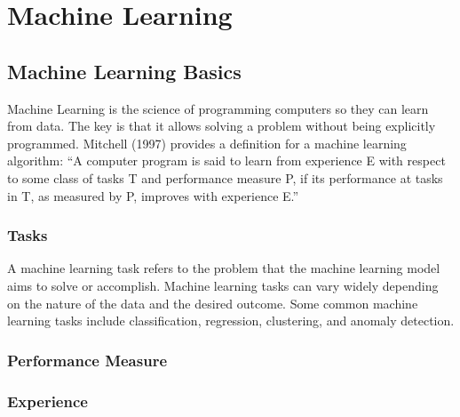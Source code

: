 \documentclass[../main.tex]{subfiles}
\begin{document}
	\chapter{Machine Learning} \label{ch:machine}
	

	\section{Machine Learning Basics}
	\noindent 
	
	\noindent Machine Learning is the science of programming computers so they can learn from data. The key is that it allows solving a problem without being explicitly programmed. Mitchell (1997) provides a deﬁnition for a machine learning algorithm: “A computer program is said to learn from experience E with respect to some class of tasks T and performance measure P, if its performance at tasks in T, as measured by P, improves with experience E.” 
	
	
	
	\subsection{Tasks}
	A machine learning task refers to the problem that the machine learning model aims to solve or accomplish. Machine learning tasks can vary widely depending on the nature of the data and the desired outcome. Some common machine learning tasks include classification, regression, clustering, and anomaly detection.
	
	
	\subsection{Performance Measure}
	\subsection{Experience}
\end{document}

